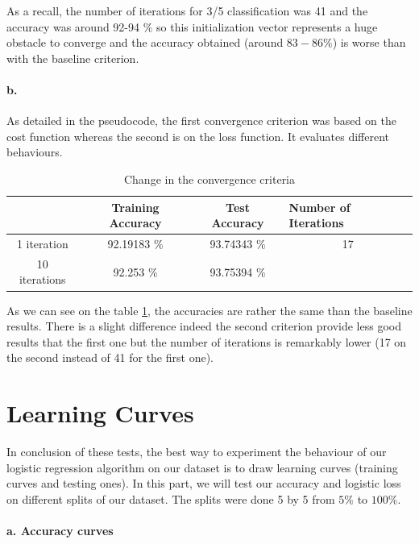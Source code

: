 \documentclass[a4paper,11pt]{article}
\begin{document}
As a recall, the number of iterations for 3/5 classification was 41 and the accuracy was around 92-94 $\%$ so this initialization vector represents a huge obstacle to converge and the accuracy obtained (around $83-86 \%$) is worse than with the baseline criterion.

\paragraph*{b.}

As detailed in the pseudocode, the first convergence criterion was based on the cost function whereas the second is on the loss function. It evaluates different behaviours.

\begin{table}[H]
\centering
\caption{Change in the convergence criteria}
\label{change_converg}
\begin{tabular}{c|c|c|l}
\cline{2-4}
 & Training Accuracy & Test Accuracy & \multicolumn{1}{l|}{Number of Iterations} \\ \hline
\multicolumn{1}{|c|}{1 iteration} & 92.19183 \% & 93.74343 \% & \multicolumn{1}{c|}{17} \\ \hline
\multicolumn{1}{|c|}{10 iterations} & 92.253 \% & 93.75394 \% &  \\ \cline{1-3}
\end{tabular}
\end{table}

As we can see on the table \ref{change_converg}, the accuracies are rather the same than the baseline results. There is a slight difference indeed the second criterion provide less good results that the first one but the number of iterations is remarkably lower (17 on the second instead of 41 for the first one).

\section{Learning Curves}

In conclusion of these tests, the best way to experiment the behaviour of our logistic regression algorithm on our dataset is to draw learning curves (training curves and testing ones). In this part, we will test our accuracy and logistic loss on different splits of our dataset. The splits were done 5 by 5 from $5\%$ to $100\%$.

\paragraph*{a. Accuracy curves}
\end{document}
